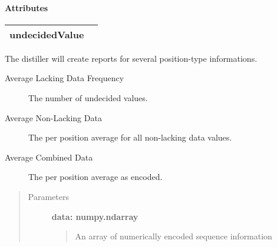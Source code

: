 \documentclass[letterpaper,10pt,english]{sphinxmanual}
\begin{document}
\begin{fulllineitems}
\begin{description}
\end{description}


\paragraph{Attributes}

\begin{tabulary}{\linewidth}{|L|L|}
\hline

undecidedValue
 & \\
\hline\end{tabulary}


\begin{fulllineitems}
\label{fseq.reporting:fseq.reporting.report_builder.ReportBuilderPositionAverage.DEFAULT_REPORTS}
\end{fulllineitems}


\begin{fulllineitems}
\label{fseq.reporting:fseq.reporting.report_builder.ReportBuilderPositionAverage.distill}
The distiller will create reports for several position-type
informations.
\begin{description}
\item[{Average Lacking Data Frequency}] \leavevmode
The number of undecided values.

\item[{Average Non-Lacking Data}] \leavevmode
The per position average for all non-lacking data values.

\item[{Average Combined Data}] \leavevmode
The per position average as encoded.

\end{description}
\begin{quote}\begin{description}
\item[{Parameters}] \leavevmode
\textbf{data: numpy.ndarray}
\begin{quote}

An array of numerically encoded sequence information
\end{quote}


\end{description}
\end{quote}
\end{fulllineitems}
\end{fulllineitems}
\end{document}
